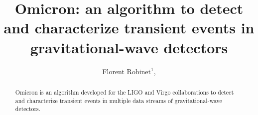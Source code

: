 \documentclass[aps]{revtex4-1}
\begin{document}

\title{Omicron: an algorithm to detect and characterize transient events in gravitational-wave detectors}

\begin{abstract}
  Omicron is an algorithm developed for the LIGO and Virgo collaborations to detect and characterize transient events in multiple data streams of gravitational-wave detectors.
\end{abstract}

\author{
  Florent Robinet$^1$,  
}
        
\address{$^1$LAL, Univ Paris-Sud, CNRS/IN2P3, Orsay, France}

\maketitle

\tableofcontents




%





\end{document}
